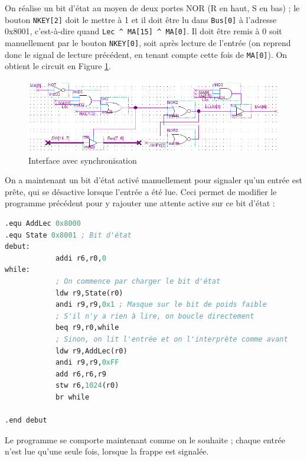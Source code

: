 \documentclass[a4paper,11pt]{article}
\begin{document}
On réalise un bit d'état au moyen de deux portes NOR (R en haut, S en bas) ; le bouton \verb?NKEY[2]? doit le mettre à 1 et il doit être lu dans \verb?Bus[0]? à l'adresse 0x8001, c'est-à-dire quand \verb?Lec ^ MA[15] ^ MA[0]?. Il doit être remis à 0 soit manuellement par le bouton \verb?NKEY[0]?, soit après lecture de l'entrée (on reprend donc le signal de lecture précédent, en tenant compte cette fois de \verb?MA[0]?). On obtient le circuit en Figure \ref{sync}.

\begin{figure}[h]\center
\includegraphics[scale=0.7]{tp7-2.PNG}
\caption{Interface avec synchronisation}
\label{sync}
\end{figure}

On a maintenant un bit d'état activé manuellement pour signaler qu'un entrée est prête, qui se désactive lorsque l'entrée a été lue. Ceci permet de modifier le programme précédent pour y rajouter une attente active sur ce bit d'état :
\begin{lstlisting}[language=Lisp]
.equ AddLec 0x8000
.equ State 0x8001 ; Bit d'état
debut:
            addi r6,r0,0
while:
            ; On commence par charger le bit d'état
            ldw r9,State(r0)
            andi r9,r9,0x1 ; Masque sur le bit de poids faible
            ; S'il n'y a rien à lire, on boucle directement
            beq r9,r0,while
            ; Sinon, on lit l'entrée et on l'interprète comme avant
            ldw r9,AddLec(r0)
            andi r9,r9,0xFF
            add r6,r6,r9
            stw r6,1024(r0)
            br while
            
.end debut
\end{lstlisting}

Le programme se comporte maintenant comme on le souhaite ; chaque entrée n'est lue qu'une seule fois, lorsque la frappe est signalée.
\end{document}
